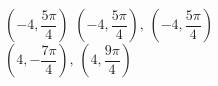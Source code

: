{ $\left( -4, \dfrac{5\pi}{4} \right)$}
{$\left( -4, \dfrac{5\pi}{4} \right), \, \left( -4, \dfrac{5\pi}{4} \right)$\\$\left( 4, -\dfrac{7\pi}{4} \right), \, \left( 4, \dfrac{9\pi}{4} \right)$\\ }
